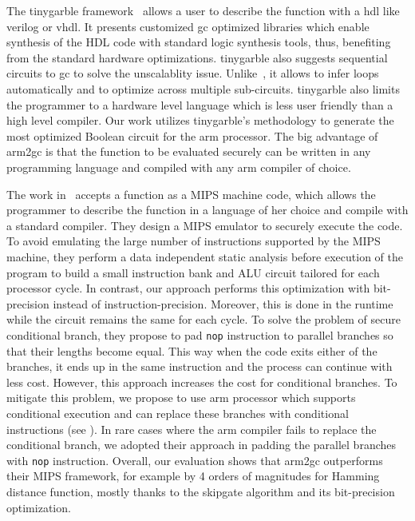 The \gls{tinygarble} framework~\cite{songhori2015tinygarble} allows a user to describe the function with a \acrfull{hdl} like \gls{verilog} or \gls{vhdl}.
It presents customized \acrshort{gc} optimized libraries which enable synthesis of the HDL code with standard logic synthesis tools, thus, benefiting from the standard hardware optimizations.
\gls{tinygarble} also suggests sequential circuits to \acrshort{gc} to solve the unscalablity issue.
Unlike~\cite{kreuter2013pcf}, it allows to infer loops automatically and to optimize across multiple sub-circuits.
\gls{tinygarble} also limits the programmer to a hardware level language which is less user friendly than a high level compiler.
Our work utilizes \gls{tinygarble}'s methodology to generate the most optimized Boolean circuit for the \gls{arm} processor.
The big advantage of \gls{arm2gc} is that the function to be evaluated securely can be written in any programming language and compiled with any \gls{arm} compiler of choice.

The work in~\cite{wang2016secure} accepts a function as a MIPS machine code, which allows the programmer to describe the function in a language of her choice and compile with a standard compiler.
They design a MIPS emulator to securely execute the code.
To avoid emulating the large number of instructions supported by the MIPS machine, they perform a data independent static analysis before execution of the program to build a small instruction bank and ALU circuit tailored for each processor cycle.
In contrast, our approach performs this optimization with bit-precision instead of instruction-precision.
Moreover, this is done in the runtime while the circuit remains the same for each cycle.
To solve the problem of secure conditional branch, they propose to pad \texttt{nop} instruction to parallel branches so that their lengths become equal.
This way when the code exits either of the branches, it ends up in the same instruction and the process can continue with less cost.
However, this approach increases the cost for conditional branches.
To mitigate this problem, we propose to use \gls{arm} processor which supports conditional execution and can replace these branches with conditional instructions (see ).
In rare cases where the \gls{arm} compiler fails to replace the conditional branch, we adopted their approach in padding the parallel branches with \texttt{nop} instruction.
Overall, our evaluation shows that \gls{arm2gc} outperforms their MIPS framework, for example by 4 orders of magnitudes for Hamming distance function, mostly thanks to the \gls{skipgate} algorithm and its bit-precision optimization.

